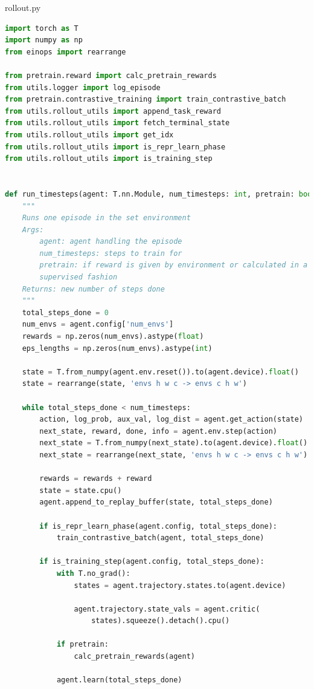 \documentclass{article}
\begin{document}
\newpage
rollout.py
\begin{lstlisting}[language=Python]
import torch as T
import numpy as np
from einops import rearrange

from pretrain.reward import calc_pretrain_rewards
from utils.logger import log_episode
from pretrain.contrastive_training import train_contrastive_batch
from utils.rollout_utils import append_task_reward
from utils.rollout_utils import fetch_terminal_state
from utils.rollout_utils import get_idx
from utils.rollout_utils import is_repr_learn_phase
from utils.rollout_utils import is_training_step


def run_timesteps(agent: T.nn.Module, num_timesteps: int, pretrain: bool):
    """
    Runs one episode in the set environment
    Args:
        agent: agent handling the episode
        num_timesteps: steps to train for
        pretrain: if reward is given by environment or calculated in a self
        supervised fashion
    Returns: new number of steps done
    """
    total_steps_done = 0
    num_envs = agent.config['num_envs']
    rewards = np.zeros(num_envs).astype(float)
    eps_lengths = np.zeros(num_envs).astype(int)

    state = T.from_numpy(agent.env.reset()).to(agent.device).float()
    state = rearrange(state, 'envs h w c -> envs c h w')

    while total_steps_done < num_timesteps:
        action, log_prob, aux_val, log_dist = agent.get_action(state)
        next_state, reward, done, info = agent.env.step(action)
        next_state = T.from_numpy(next_state).to(agent.device).float()
        next_state = rearrange(next_state, 'envs h w c -> envs c h w')

        rewards = rewards + reward
        state = state.cpu()
        agent.append_to_replay_buffer(state, total_steps_done)

        if is_repr_learn_phase(agent.config, total_steps_done):
            train_contrastive_batch(agent, total_steps_done)

        if is_training_step(agent.config, total_steps_done):
            with T.no_grad():
                states = agent.trajectory.states.to(agent.device)

                agent.trajectory.state_vals = agent.critic(
                    states).squeeze().detach().cpu()

            if pretrain:
                calc_pretrain_rewards(agent)

            agent.learn(total_steps_done)


\end{lstlisting}
\end{document}
